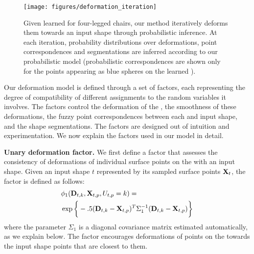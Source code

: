 \begin{figure}[t!]
\centering
\texttt{[image: figures/deformation\_iteration]}
\vskip -2mm
\caption{Given learned  for four-legged chairs, our method iteratively deforms them towards an input shape through probabilistic inference. At each iteration, probability distributions over deformations, point correspondences and segmentations are inferred according to our probabilistic model (probabilistic correspondences are shown only for the points appearing as blue spheres on the learned ).}
\vskip -8mm
\label{fig:deformation}
\end{figure}


Our deformation model is defined through a set of factors, each representing the degree of compatibility of different assignments to the random variables it involves. The factors control the deformation of the , the smoothness of these deformations, the fuzzy point correspondences between each  and input shape, and the shape segmentations. The factors are designed out of intuition and experimentation. We now explain the factors used in our model in detail. 

\textbf{Unary deformation factor.} We first define a factor that assesses the consistency of deformations of individual surface points on the  with an input shape. Given an input shape $t$ represented by its sampled surface points $\mathbf{X}_t$, the factor is defined as follows:
\begin{align*}
& \phi_1 (\mathbf{D}_{t,k}, \mathbf{X}_{t,p}, U_{t,p} = k ) = \\
& \exp\bigg\{ -.5(\mathbf{D}_{t,k} - \mathbf{X}_{t,p})^T \Sigma_1^{-1} (\mathbf{D}_{t,k} - \mathbf{X}_{t,p}) \bigg\}
\end{align*} 
where the parameter $\Sigma_1$ is a diagonal covariance matrix estimated automatically, as we explain below. The factor encourages deformations of points on the  towards the input shape points that are closest to them. 

